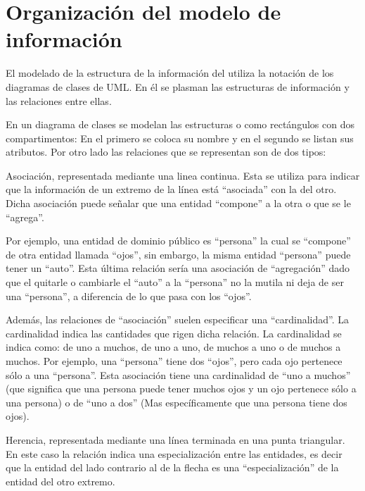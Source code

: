 \section{Organización del modelo de información}

    El modelado de la estructura de la información del \paear utiliza la notación de los diagramas de clases de UML. En él se plasman las estructuras de información y las relaciones entre ellas.

    En un diagrama de clases se modelan las estructuras o  como rectángulos con dos compartimentos: En el primero se coloca su nombre y en el segundo se listan sus atributos. Por otro lado las relaciones que se representan son de dos tipos:	

    \begin{Citemize}
	\item Asociación, representada mediante una linea continua. Esta se utiliza para indicar que la información de un extremo de la línea está ``asociada'' con la del otro. Dicha asociación puede señalar que una entidad ``compone'' a la otra o que se le ``agrega''.
	
	Por ejemplo, una entidad de dominio público es ``persona'' la cual se ``compone'' de otra entidad llamada ``ojos'', sin embargo, la misma entidad ``persona'' puede tener un ``auto''. Esta última relación sería una asociación de ``agregación'' dado que el quitarle o cambiarle el ``auto'' a la ``persona'' no la mutila ni deja de ser una ``persona'', a diferencia de lo que pasa con los ``ojos''.
	
	Además, las relaciones de ``asociación'' suelen especificar una ``cardinalidad''. La cardinalidad indica las cantidades que rigen dicha relación. La cardinalidad se indica como: de uno a muchos, de uno a uno, de muchos a uno o de muchos a muchos. Por ejemplo, una ``persona'' tiene dos ``ojos'', pero cada ojo pertenece sólo a una ``persona''. Esta asociación tiene una cardinalidad de ``uno a muchos'' (que significa que una persona puede tener muchos ojos y un ojo pertenece sólo a una persona) o de ``uno a dos'' (Mas específicamente que una persona tiene dos ojos). 
	
	\item Herencia, representada mediante una línea terminada en una punta triangular. En este caso la relación indica una especialización entre las entidades, es decir que la  entidad del lado contrario al de la flecha es una ``especialización'' de la entidad del otro extremo.
    \end{Citemize}

